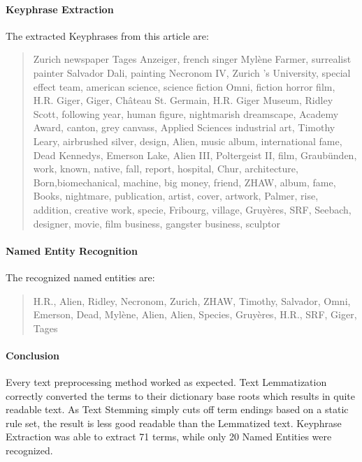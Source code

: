 \paragraph{Keyphrase Extraction}
The extracted Keyphrases from this article are:
\begin{quote}
    Zurich newspaper Tages Anzeiger, french singer Mylène Farmer, surrealist painter Salvador Dali,
    painting Necronom IV, Zurich ’s University, special effect team, american science, science fiction Omni,
    fiction horror film, H.R. Giger, Giger, Château St. Germain, H.R. Giger Museum, Ridley Scott,
    following year, human figure, nightmarish dreamscape, Academy Award, canton, grey canvass, Applied Sciences
    industrial art, Timothy Leary, airbrushed silver, design, Alien, music album, international fame,
    Dead Kennedys, Emerson Lake, Alien III, Poltergeist II, film, Graubünden, work, known, native, fall, report,
    hospital, Chur, architecture, Born,biomechanical, machine, big money, friend, ZHAW, album, fame, Books,
    nightmare, publication, artist, cover, artwork, Palmer, rise, addition, creative work, specie, Fribourg,
    village, Gruyères, SRF, Seebach, designer, movie, film business, gangster business, sculptor
\end{quote}

\paragraph{Named Entity Recognition}
The recognized named entities are:
\begin{quote}
    H.R., Alien, Ridley, Necronom, Zurich, ZHAW, Timothy, Salvador, Omni, Emerson, Dead, Mylène, Alien, Alien,
    Species, Gruyères, H.R., SRF, Giger, Tages
\end{quote}

\paragraph{Conclusion}
Every text preprocessing method worked as expected.
Text Lemmatization correctly converted the terms to their dictionary base roots
which results in quite readable text.
As Text Stemming simply cuts off term endings based on a static rule set, the result is less
good readable than the Lemmatized text.
Keyphrase Extraction was able to extract 71 terms, while only 20 Named Entities were recognized.
